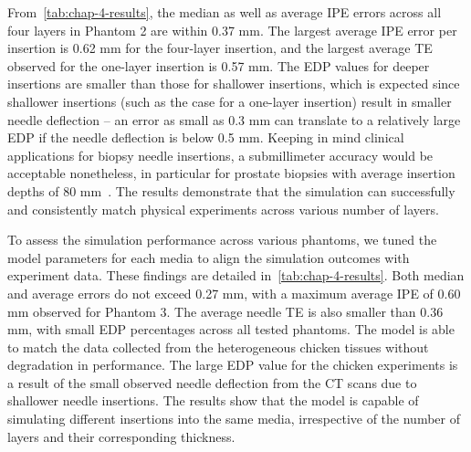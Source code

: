 From~\cref{tab:chap-4-results}, the median as well as average IPE errors across all four layers in Phantom 2 are within 0.37 mm. The largest average IPE error per insertion is 0.62 mm for the four-layer insertion, and the largest average TE observed for the one-layer insertion is 0.57 mm. The EDP values for deeper insertions are smaller than those for shallower insertions, which is expected since shallower insertions (such as the case for a one-layer insertion) result in smaller needle deflection -- an error as small as 0.3 mm can translate to a relatively large EDP if the needle deflection is below 0.5 mm. Keeping in mind clinical applications for biopsy needle insertions, a submillimeter accuracy would be acceptable nonetheless, in particular for prostate biopsies with average insertion depths of 80 mm~\parencite{moreiraEvaluationRobotassistedMRIguided2018}. The results demonstrate that the simulation can successfully and consistently match physical experiments across various number of layers.

To assess the simulation performance across various phantoms, we tuned the model parameters for each media to align the simulation outcomes with experiment data. These findings are detailed in~\cref{tab:chap-4-results}. Both median and average errors do not exceed 0.27 mm, with a maximum average IPE of 0.60 mm observed for Phantom 3. The average needle TE is also smaller than 0.36 mm, with small EDP percentages across all tested phantoms. The model is able to match the data collected from the heterogeneous chicken tissues without degradation in performance. The large EDP value for the chicken experiments is a result of the small observed needle deflection from the CT scans due to shallower needle insertions. The results show that the model is capable of simulating different insertions into the same media, irrespective of the number of layers and their corresponding thickness. 


